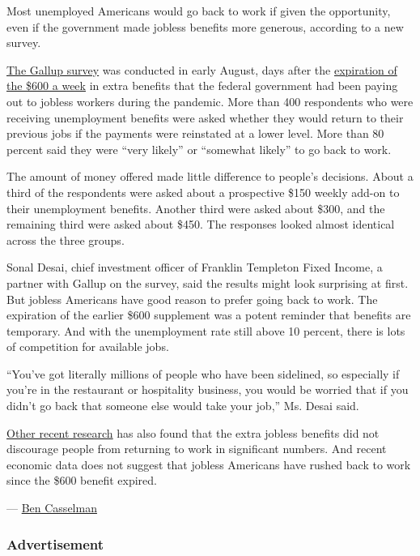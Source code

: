 Most unemployed Americans would go back to work if given the
opportunity, even if the government made jobless benefits more generous,
according to a new survey.

\href{https://news.gallup.com/poll/318452/broad-bipartisan-support-additional-stimulus.aspx}{The
Gallup survey} was conducted in early August, days after the
\href{https://www.nytimes3xbfgragh.onion/2020/07/29/business/economy/unemployment-benefits-coronavirus.html}{expiration
of the \$600 a week} in extra benefits that the federal government had
been paying out to jobless workers during the pandemic. More than 400
respondents who were receiving unemployment benefits were asked whether
they would return to their previous jobs if the payments were reinstated
at a lower level. More than 80 percent said they were ``very likely'' or
``somewhat likely'' to go back to work.

The amount of money offered made little difference to people's
decisions. About a third of the respondents were asked about a
prospective \$150 weekly add-on to their unemployment benefits. Another
third were asked about \$300, and the remaining third were asked about
\$450. The responses looked almost identical across the three groups.

Sonal Desai, chief investment officer of Franklin Templeton Fixed
Income, a partner with Gallup on the survey, said the results might look
surprising at first. But jobless Americans have good reason to prefer
going back to work. The expiration of the earlier \$600 supplement was a
potent reminder that benefits are temporary. And with the unemployment
rate still above 10 percent, there is lots of competition for available
jobs.

``You've got literally millions of people who have been sidelined, so
especially if you're in the restaurant or hospitality business, you
would be worried that if you didn't go back that someone else would take
your job,'' Ms. Desai said.

\href{https://news.yale.edu/2020/07/27/yale-study-finds-expanded-jobless-benefits-did-not-reduce-employment}{Other
recent research} has also found that the extra jobless benefits did not
discourage people from returning to work in significant numbers. And
recent economic data does not suggest that jobless Americans have rushed
back to work since the \$600 benefit expired.

--- \href{https://www.nytimes3xbfgragh.onion/by/ben-casselman}{Ben
Casselman}

\hypertarget{advertisement-2}{%
\subsubsection{Advertisement}\label{advertisement-2}}

